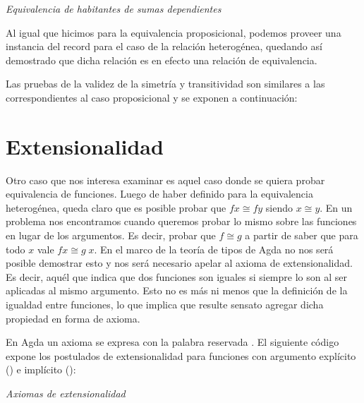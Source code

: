 \begin{agdacode}{\it Equivalencia de habitantes de sumas dependientes}\label{code:dSumEq}

\end{agdacode}

\vspace{2ex}

Al igual que hicimos para la equivalencia proposicional, podemos proveer una instancia del record  para el caso de la relación heterogénea, quedando así demostrado que dicha relación es en efecto una relación de equivalencia.


Las pruebas de la validez de la simetría y transitividad son similares a las correspondientes al caso proposicional y se exponen a continuación:



\section{Extensionalidad}

Otro caso que nos interesa examinar es aquel caso donde se quiera probar equivalencia de funciones.
Luego de haber definido  para la equivalencia heterogénea, queda claro que es posible probar que $f x \cong f y$ siendo $x\cong y$. En un problema nos encontramos cuando queremos probar lo mismo sobre las funciones en lugar de los argumentos. Es decir, probar que $f \cong g$ a partir de saber que para todo $x$ vale $f x \cong g\; x$.
En el marco de la teoría de tipos de Agda no nos será posible demostrar esto y nos será necesario apelar al axioma de extensionalidad. Es decir, aquél que indica que dos funciones son iguales si siempre lo son al ser aplicadas al mismo argumento. Esto no es más ni menos que la definición de la igualdad entre funciones, lo que implica que resulte sensato agregar dicha propiedad en forma de axioma.

En Agda un axioma se expresa con la palabra reservada .
El siguiente código expone los postulados de extensionalidad para funciones con argumento explícito () e implícito ():
\begin{agdacode}\label{code:ext}{\it Axiomas de extensionalidad}

  
\end{agdacode}

